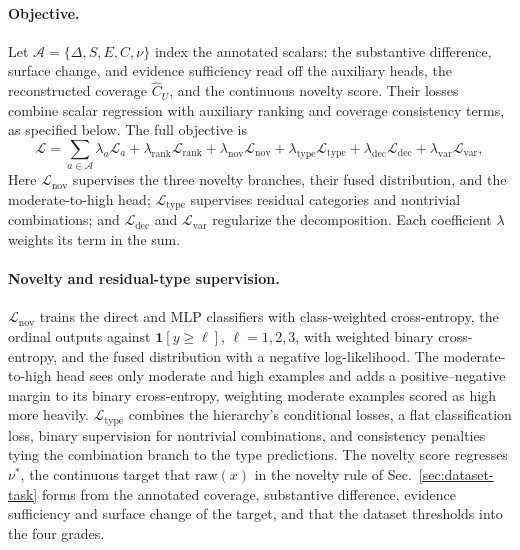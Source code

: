 \paragraph{Objective.}
Let $\mathcal{A}=\{\Delta,S,E,C,\nu\}$ index the annotated scalars: the
substantive difference, surface change, and evidence sufficiency read off the
auxiliary heads, the reconstructed coverage $\widehat C_U$, and the continuous
novelty score. Their losses combine scalar regression with auxiliary ranking
and coverage consistency terms, as specified below. The full objective is
\begin{equation}
 \mathcal{L}=\sum_{a\in\mathcal{A}}\lambda_{a}\mathcal{L}_{a}
 +\lambda_{\mathrm{rank}}\mathcal{L}_{\mathrm{rank}}
 +\lambda_{\mathrm{nov}}\mathcal{L}_{\mathrm{nov}}
 +\lambda_{\mathrm{type}}\mathcal{L}_{\mathrm{type}}
 +\lambda_{\mathrm{dec}}\mathcal{L}_{\mathrm{dec}}
 +\lambda_{\mathrm{var}}\mathcal{L}_{\mathrm{var}},
 \label{eq:training-objective}
\end{equation}
Here $\mathcal{L}_{\mathrm{nov}}$ supervises the three novelty branches, their
fused distribution, and the moderate-to-high head;
$\mathcal{L}_{\mathrm{type}}$ supervises residual categories and nontrivial
combinations; and $\mathcal{L}_{\mathrm{dec}}$ and
$\mathcal{L}_{\mathrm{var}}$ regularize the decomposition.
Each coefficient $\lambda$ weights its term in the sum.

\paragraph{Novelty and residual-type supervision.}
$\mathcal{L}_{\mathrm{nov}}$ trains the direct and MLP
classifiers with class-weighted cross-entropy, the ordinal outputs against
$\mathbf{1}[y\geq\ell]$, $\ell=1,2,3$, with weighted binary cross-entropy, and
the fused distribution with a negative log-likelihood. The moderate-to-high head
sees only moderate and high examples and adds a positive--negative margin to its
binary cross-entropy, weighting moderate examples scored as high more heavily.
$\mathcal{L}_{\mathrm{type}}$ combines the hierarchy's conditional losses, a
flat classification loss, binary supervision for nontrivial combinations, and
consistency penalties tying the combination branch to the type predictions.
The novelty score regresses $\nu^*$, the continuous target that
$\mathrm{raw}(x)$ in the novelty rule of Sec.~\ref{sec:dataset-task} forms
from the annotated coverage, substantive difference, evidence sufficiency and
surface change of the target, and that the dataset thresholds into the four
grades.

